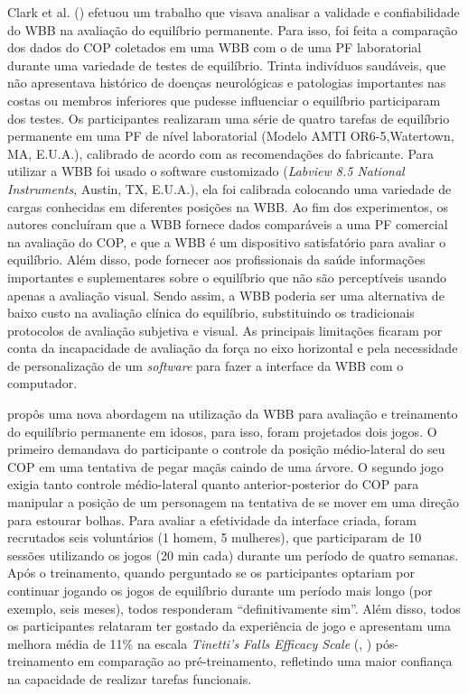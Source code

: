 Clark et al. (\citeyear{clark2010validity}) efetuou um trabalho que visava analisar a validade e confiabilidade do WBB na avaliação do equilíbrio permanente. Para isso, foi feita a comparação dos dados do COP coletados em uma WBB com o de uma PF laboratorial durante uma variedade de testes de equilíbrio. Trinta indivíduos saudáveis, que não apresentava histórico de doenças neurológicas e patologias importantes nas costas ou membros inferiores que pudesse influenciar o equilíbrio participaram dos testes. Os participantes realizaram uma série de quatro tarefas de equilíbrio permanente em uma PF de nível laboratorial (Modelo AMTI OR6-5,Watertown, MA, E.U.A.), calibrado de acordo com as recomendações do fabricante. Para utilizar a WBB foi usado o software customizado (\textit{Labview 8.5 National Instruments}, Austin, TX, E.U.A.), ela foi calibrada colocando uma variedade de cargas conhecidas em diferentes posições na WBB. Ao fim dos experimentos, os autores concluíram que a WBB fornece dados comparáveis a uma PF comercial na avaliação do COP, e que a WBB é um dispositivo satisfatório para avaliar o equilíbrio. Além disso, pode fornecer aos profissionais da saúde informações importantes e suplementares sobre o equilíbrio que não são perceptíveis usando apenas a avaliação visual. Sendo assim, a WBB poderia ser uma alternativa de baixo custo na avaliação clínica do equilíbrio, substituindo os tradicionais protocolos de avaliação subjetiva e visual. As principais limitações ficaram por conta da incapacidade de avaliação da força no eixo horizontal e pela necessidade de personalização de um \textit{software} para fazer a interface da WBB com o computador.

\cite{young2011assessing} propôs uma nova abordagem na utilização da WBB para avaliação e treinamento do equilíbrio permanente em idosos, para isso, foram   projetados dois jogos. O primeiro demandava do participante o controle da posição médio-lateral do seu COP em uma tentativa de pegar maçãs caindo de uma árvore. O segundo jogo exigia tanto controle médio-lateral quanto anterior-posterior do COP para manipular a posição de um personagem na tentativa de se mover em uma direção para estourar bolhas. Para avaliar a efetividade da interface criada, foram recrutados seis voluntários (1 homem, 5 mulheres), que participaram de 10 sessões utilizando os jogos (20 min cada) durante um período de quatro semanas.
Após o treinamento, quando perguntado se os participantes optariam por continuar jogando os jogos de equilíbrio durante um período mais longo (por exemplo, seis meses), todos responderam “definitivamente sim”. Além disso, todos os participantes relataram ter gostado da experiência de jogo e apresentam uma melhora média de 11\%  na escala \textit{Tinetti's Falls Efficacy Scale} (\citeauthor{tinetti1990falls}, \citeyear{tinetti1990falls}) pós-treinamento em comparação ao pré-treinamento, refletindo uma maior confiança na capacidade de realizar tarefas funcionais.


